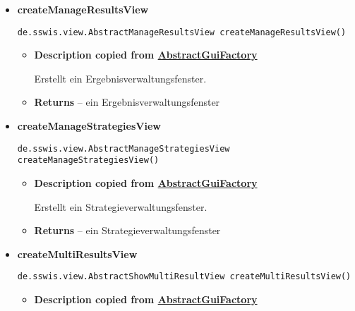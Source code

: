 {{{{{{{\begin{itemize}
{\begin{itemize}
{Erstellt ein Initialisierungsverwaltungsfenster.
}
\item{{\bf  Returns} -- 
ein Initialisierungsverwaltungsfenster 
}%
\end{itemize}
}%
\item{ 
\hypertarget{de.sswis.controller.SwingGuiFactory.createManageResultsView()}{{\bf  createManageResultsView}\\}
\begin{lstlisting}[frame=none]
de.sswis.view.AbstractManageResultsView createManageResultsView()\end{lstlisting} %
\begin{itemize}
\item{
{\bf  Description copied from \hyperlink{de.sswis.controller.AbstractGuiFactory}{AbstractGuiFactory}{\small {}} }

Erstellt ein Ergebnisverwaltungsfenster.
}
\item{{\bf  Returns} -- 
ein Ergebnisverwaltungsfenster 
}%
\end{itemize}
}%
\item{ 
\hypertarget{de.sswis.controller.SwingGuiFactory.createManageStrategiesView()}{{\bf  createManageStrategiesView}\\}
\begin{lstlisting}[frame=none]
de.sswis.view.AbstractManageStrategiesView createManageStrategiesView()\end{lstlisting} %
\begin{itemize}
\item{
{\bf  Description copied from \hyperlink{de.sswis.controller.AbstractGuiFactory}{AbstractGuiFactory}{\small {}} }

Erstellt ein Strategieverwaltungsfenster.
}
\item{{\bf  Returns} -- 
ein Strategieverwaltungsfenster 
}%
\end{itemize}
}%
\item{ 
\hypertarget{de.sswis.controller.SwingGuiFactory.createMultiResultsView()}{{\bf  createMultiResultsView}\\}
\begin{lstlisting}[frame=none]
de.sswis.view.AbstractShowMultiResultView createMultiResultsView()\end{lstlisting} %
\begin{itemize}
\item{
{\bf  Description copied from \hyperlink{de.sswis.controller.AbstractGuiFactory}{AbstractGuiFactory}{\small {}} }

}
\end{itemize}}
\end{itemize}}}}}}}}
